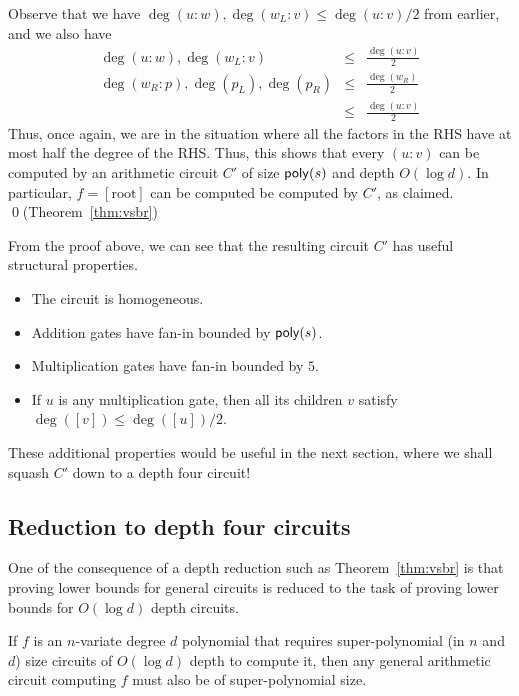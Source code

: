 Observe that we have $\deg (u:w), \deg(w_L:v) \leq \deg(u:v)/2$ from earlier, and we also have
\begin{eqnarray*}
\deg(u:w),\deg(w_L:v) & \leq &\frac{\deg(u:v)}{2}\\
\deg(w_R:p),\deg(p_L),\deg(p_R) & \leq & \frac{\deg(w_R)}{2}\\
 & \leq & \frac{\deg(u:v)}{2}
\end{eqnarray*}
Thus, once again, we are in the situation where all the factors in the RHS have at most half the degree of the RHS. Thus, this shows that every $(u:v)$ can be computed by an arithmetic circuit $C'$ of size $\mathsf{poly}(s)$ and depth $O(\log d)$. In particular, $f = [\mathrm{root}]$ can be computed be computed by $C'$, as claimed. \qed {(\footnotesize Theorem~\ref{thm:vsbr})}\\

\begin{remark}\label{remark:vsbr}
From the proof above, we can see that the resulting circuit $C'$ has useful structural properties. 
\begin{itemize}
  \item The circuit is homogeneous. 
  \item Addition gates have fan-in bounded by $\mathsf{poly}(s)$. 
  \item Multiplication gates have fan-in bounded by $5$. 
  \item If $u$ is any multiplication gate, then all its children $v$ satisfy $\deg([v])\leq \deg([u])/2$. 
\end{itemize}
\end{remark}

These additional properties would be useful in the next section, where we shall squash $C'$ down to a depth four circuit!

\subsection{Reduction to depth four circuits}

One of the consequence of a depth reduction such as Theorem~\ref{thm:vsbr} is that proving lower bounds for general circuits is reduced to the task of proving lower bounds for $O(\log d)$ depth circuits. 

\begin{corollary}\label{cor:vsbr-contra}
If $f$ is an $n$-variate degree $d$ polynomial that requires super-polynomial (in $n$ and $d$) size circuits of $O(\log d)$ depth to compute it, then any general arithmetic circuit computing $f$ must also be of super-polynomial size. 
\end{corollary}

